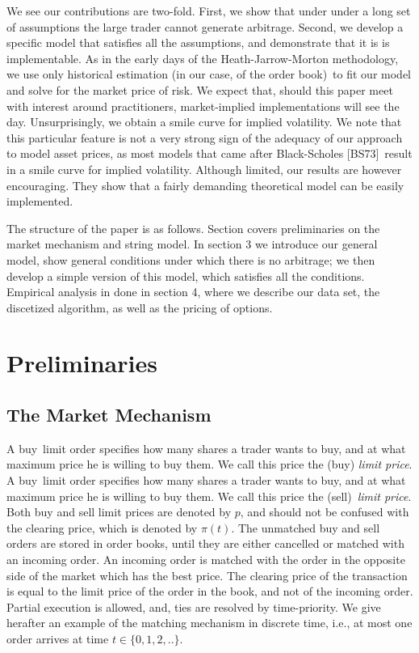 \documentclass{article}
\begin{document}
We see our contributions are two-fold. First, we show that under under a
long set of assumptions the large trader cannot generate arbitrage. Second,
we develop a specific model that satisfies all the assumptions, and
demonstrate that it is is implementable. As in the early days of the
Heath-Jarrow-Morton methodology, we use only historical estimation (in our
case, of the order book)\ to fit our model and solve for the market price of
risk. We expect that, should this paper meet with interest around
practitioners, market-implied implementations will see the day.
Unsurprisingly, we obtain a smile curve for implied volatility. We note that
this particular feature is not a very strong sign of the adequacy of our
approach to model asset prices, as most models that came after Black-Scholes
[BS73]\ result in a smile curve for implied volatility. Although limited,
our results are however encouraging. They show that a fairly demanding
theoretical model can be easily implemented.

The structure of the paper is as follows. Section covers preliminaries on
the market mechanism and string model. In section 3 we introduce our general
model, show general conditions under which there is no arbitrage; we then
develop a simple version of this model, which satisfies all the conditions.
Empirical analysis in done in section 4, where we describe our data set, the
discetized algorithm, as well as the pricing of options.

\section{Preliminaries}

\subsection{The Market Mechanism}

\noindent A buy\ limit order specifies how many shares a trader wants to
buy, and at what maximum price he is willing to buy them. We call this price
the (buy) \textit{limit price}. A buy\ limit order specifies how many shares
a trader wants to buy, and at what maximum price he is willing to buy them.
We call this price the (sell)\ \textit{limit price}. Both buy and sell limit
prices are denoted by $p$, and should not be confused with the clearing
price, which is denoted by $\pi (t)$. The unmatched buy and sell orders are
stored in order books, until they are either cancelled or matched with an
incoming order. An incoming order is matched with the order in the opposite
side of the market which has the best price. The clearing price of the
transaction is equal to the limit price of the order in the book, and not of
the incoming order. Partial execution is allowed, and, ties are resolved by
time-priority. We give herafter an example of the matching mechanism in
discrete time, i.e., at most one order arrives at time $t\in \{0,1,2,..\}.$
\end{document}
